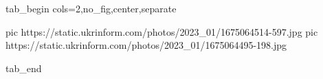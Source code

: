  
 
 
 
 

\ifcmt
	tab_begin cols=2,no_fig,center,separate

		 pic https://static.ukrinform.com/photos/2023_01/1675064514-597.jpg
		 pic https://static.ukrinform.com/photos/2023_01/1675064495-198.jpg

	tab_end
\fi
